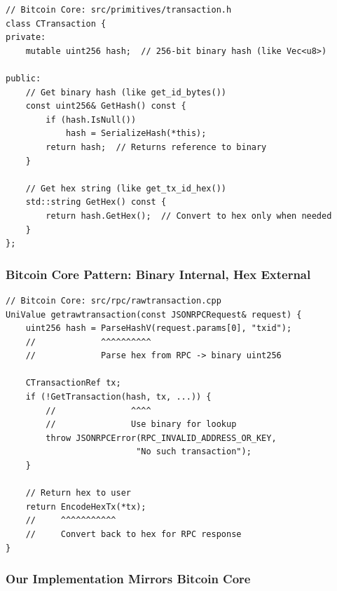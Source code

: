 \begin{listing}[H]
\caption{Bitcoin Core transaction ID storage (C++)}
\label{lst:ch06-13}
\begin{verbatim}
// Bitcoin Core: src/primitives/transaction.h
class CTransaction {
private:
    mutable uint256 hash;  // 256-bit binary hash (like Vec<u8>)

public:
    // Get binary hash (like get_id_bytes())
    const uint256& GetHash() const {
        if (hash.IsNull())
            hash = SerializeHash(*this);
        return hash;  // Returns reference to binary
    }

    // Get hex string (like get_tx_id_hex())
    std::string GetHex() const {
        return hash.GetHex();  // Convert to hex only when needed
    }
};
\end{verbatim}
\end{listing}

\subsubsection{Bitcoin Core Pattern: Binary Internal, Hex External}
\label{sec:ch06-bitcoin-pattern}

\begin{listing}[H]
\caption{Bitcoin Core RPC transaction lookup}
\label{lst:ch06-14}
\begin{verbatim}
// Bitcoin Core: src/rpc/rawtransaction.cpp
UniValue getrawtransaction(const JSONRPCRequest& request) {
    uint256 hash = ParseHashV(request.params[0], "txid");
    //             ^^^^^^^^^^
    //             Parse hex from RPC -> binary uint256

    CTransactionRef tx;
    if (!GetTransaction(hash, tx, ...)) {
        //               ^^^^
        //               Use binary for lookup
        throw JSONRPCError(RPC_INVALID_ADDRESS_OR_KEY,
                          "No such transaction");
    }

    // Return hex to user
    return EncodeHexTx(*tx);
    //     ^^^^^^^^^^^
    //     Convert back to hex for RPC response
}
\end{verbatim}
\end{listing}

\subsubsection{Our Implementation Mirrors Bitcoin Core}
\label{sec:ch06-our-implementation}

